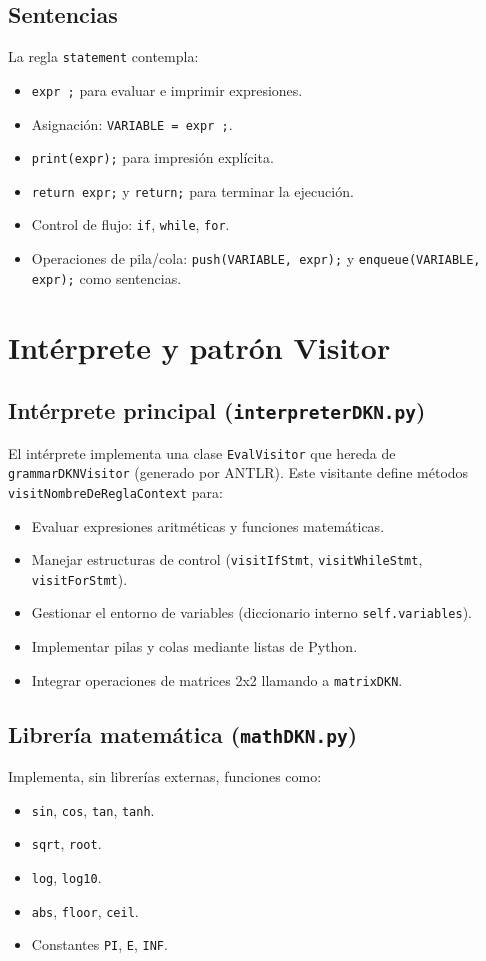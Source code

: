 \documentclass[stu, 12pt, letterpaper, donotrepeattitle, floatsintext, natbib]{apa7}
\begin{document}
\subsection{Sentencias}
La regla \texttt{statement} contempla:
\begin{itemize}
  \item \texttt{expr ;} para evaluar e imprimir expresiones.
  \item Asignación: \texttt{VARIABLE = expr ;}.
  \item \texttt{print(expr);} para impresión explícita.
  \item \texttt{return expr;} y \texttt{return;} para terminar la ejecución.
  \item Control de flujo: \texttt{if}, \texttt{while}, \texttt{for}.
  \item Operaciones de pila/cola: \texttt{push(VARIABLE, expr);} y \texttt{enqueue(VARIABLE, expr);} como sentencias.
\end{itemize}

\section{\large Intérprete y patrón Visitor}

\subsection{Intérprete principal (\texttt{interpreterDKN.py})}
El intérprete implementa una clase \texttt{EvalVisitor} que hereda de \texttt{grammarDKNVisitor} (generado por ANTLR).
Este visitante define métodos \texttt{visitNombreDeReglaContext} para:
\begin{itemize}
  \item Evaluar expresiones aritméticas y funciones matemáticas.
  \item Manejar estructuras de control (\texttt{visitIfStmt}, \texttt{visitWhileStmt}, \texttt{visitForStmt}).
  \item Gestionar el entorno de variables (diccionario interno \texttt{self.variables}).
  \item Implementar pilas y colas mediante listas de Python.
  \item Integrar operaciones de matrices 2x2 llamando a \texttt{matrixDKN}.
\end{itemize}

\subsection{Librería matemática (\texttt{mathDKN.py})}
Implementa, sin librerías externas, funciones como:
\begin{itemize}
  \item \texttt{sin}, \texttt{cos}, \texttt{tan}, \texttt{tanh}.
  \item \texttt{sqrt}, \texttt{root}.
  \item \texttt{log}, \texttt{log10}.
  \item \texttt{abs}, \texttt{floor}, \texttt{ceil}.
  \item Constantes \texttt{PI}, \texttt{E}, \texttt{INF}.
\end{itemize}
\end{document}
